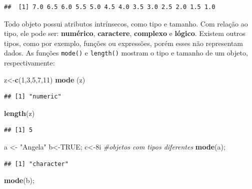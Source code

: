 \documentclass[
]{book}
\newenvironment{Shaded}{\begin{snugshade}}{\end{snugshade}}
\newcommand{\CommentTok}[1]{\textcolor[rgb]{0.56,0.35,0.01}{\textit{#1}}}
\newcommand{\DecValTok}[1]{\textcolor[rgb]{0.00,0.00,0.81}{#1}}
\newcommand{\KeywordTok}[1]{\textcolor[rgb]{0.13,0.29,0.53}{\textbf{#1}}}
\newcommand{\NormalTok}[1]{#1}
\newcommand{\OtherTok}[1]{\textcolor[rgb]{0.56,0.35,0.01}{#1}}
\newcommand{\StringTok}[1]{\textcolor[rgb]{0.31,0.60,0.02}{#1}}
\begin{document}
\begin{verbatim}
##  [1] 7.0 6.5 6.0 5.5 5.0 4.5 4.0 3.5 3.0 2.5 2.0 1.5 1.0
\end{verbatim}

Todo objeto possui atributos intrínsecos, como tipo e tamanho. Com relação ao tipo, ele pode ser: \textbf{numérico}, \textbf{caractere}, \textbf{complexo} e \textbf{lógico}. Existem outros tipos, como por exemplo, funções ou expressões, porém esses não representam dados.
As funções \texttt{mode()} e \texttt{length()} mostram o tipo e tamanho de um objeto, respectivamente:

\begin{Shaded}
\begin{Highlighting}[]
\NormalTok{z<-}\KeywordTok{c}\NormalTok{(}\DecValTok{1}\NormalTok{,}\DecValTok{3}\NormalTok{,}\DecValTok{5}\NormalTok{,}\DecValTok{7}\NormalTok{,}\DecValTok{11}\NormalTok{) }
\KeywordTok{mode}\NormalTok{ (z)}
\end{Highlighting}
\end{Shaded}

\begin{verbatim}
## [1] "numeric"
\end{verbatim}

\begin{Shaded}
\begin{Highlighting}[]
\KeywordTok{length}\NormalTok{(z)}
\end{Highlighting}
\end{Shaded}

\begin{verbatim}
## [1] 5
\end{verbatim}

\begin{Shaded}
\begin{Highlighting}[]
\NormalTok{a <-}\StringTok{ "Angela"}
\NormalTok{b<-}\OtherTok{TRUE}\NormalTok{; }
\NormalTok{c<-8i }\CommentTok{#objetos com tipos diferentes}
\KeywordTok{mode}\NormalTok{(a); }
\end{Highlighting}
\end{Shaded}

\begin{verbatim}
## [1] "character"
\end{verbatim}

\begin{Shaded}
\begin{Highlighting}[]
\KeywordTok{mode}\NormalTok{(b); }
\end{Highlighting}
\end{Shaded}
\end{document}

